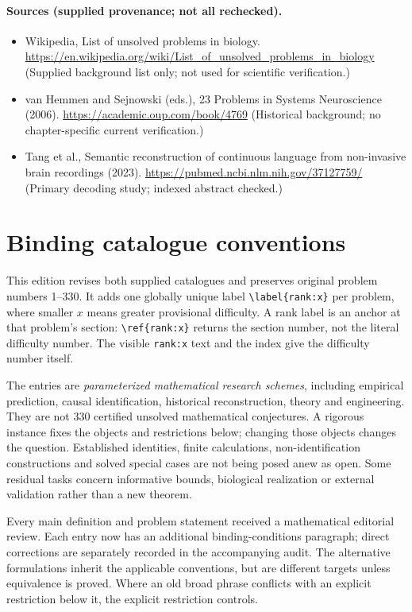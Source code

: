 \documentclass[11pt]{article}
\begin{document}
\paragraph{Sources (supplied provenance; not all rechecked).} \begin{itemize}
\item Wikipedia, List of unsolved problems in biology. \url{https://en.wikipedia.org/wiki/List_of_unsolved_problems_in_biology} (Supplied background list only; not used for scientific verification.)
\item van Hemmen and Sejnowski (eds.), 23 Problems in Systems Neuroscience (2006). \url{https://academic.oup.com/book/4769} (Historical background; no chapter-specific current verification.)
\item Tang et al., Semantic reconstruction of continuous language from non-invasive brain recordings (2023). \url{https://pubmed.ncbi.nlm.nih.gov/37127759/} (Primary decoding study; indexed abstract checked.)
\end{itemize}


\section*{Binding catalogue conventions}
This edition revises both supplied catalogues and preserves original problem numbers 1--330. It adds one globally unique label \verb|\label{rank:x}| per problem, where smaller $x$ means greater provisional difficulty. A rank label is an anchor at that problem's section: \verb|\ref{rank:x}| returns the section number, not the literal difficulty number. The visible \texttt{rank:x} text and the index give the difficulty number itself.

The entries are \emph{parameterized mathematical research schemes}, including empirical prediction, causal identification, historical reconstruction, theory and engineering. They are not 330 certified unsolved mathematical conjectures. A rigorous instance fixes the objects and restrictions below; changing those objects changes the question. Established identities, finite calculations, non-identification constructions and solved special cases are not being posed anew as open. Some residual tasks concern informative bounds, biological realization or external validation rather than a new theorem.

Every main definition and problem statement received a mathematical editorial review. Each entry now has an additional binding-conditions paragraph; direct corrections are separately recorded in the accompanying audit. The alternative formulations inherit the applicable conventions, but are different targets unless equivalence is proved. Where an old broad phrase conflicts with an explicit restriction below it, the explicit restriction controls.
\end{document}
